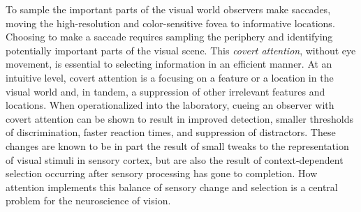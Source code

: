 To sample the important parts of the visual world observers make saccades, moving the high-resolution and color-sensitive fovea to informative locations. Choosing to make a saccade requires sampling the periphery and identifying potentially important parts of the visual scene. This \emph{covert attention}, without eye movement, is essential to selecting information in an efficient manner. At an intuitive level, covert attention is a focusing on a feature or a location in the visual world and, in tandem, a suppression of other irrelevant features and locations. When operationalized into the laboratory, cueing an observer with covert attention can be shown to result in improved detection, smaller thresholds of discrimination, faster reaction times, and suppression of distractors. These changes are known to be in part the result of small tweaks to the representation of visual stimuli in sensory cortex, but are also the result of context-dependent selection occurring after sensory processing has gone to completion. How attention implements this balance of sensory change and selection is a central problem for the neuroscience of vision.